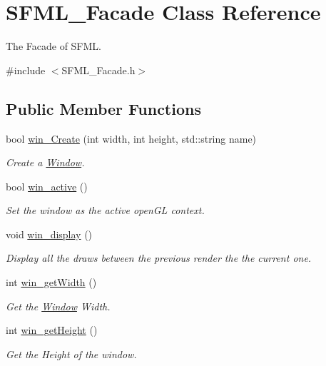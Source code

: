 \hypertarget{class_s_f_m_l___facade}{\section{S\-F\-M\-L\-\_\-\-Facade Class Reference}
\label{class_s_f_m_l___facade}
}


The Facade of S\-F\-M\-L.  




{\ttfamily \#include $<$S\-F\-M\-L\-\_\-\-Facade.\-h$>$}

\subsection*{Public Member Functions}
\begin{DoxyCompactItemize}
\item 
bool \hyperlink{class_s_f_m_l___facade_a6a7b88dd503f64f62fd92640981eccc9}{win\-\_\-\-Create} (int width, int height, std\-::string name)
\begin{DoxyCompactList}\small\item\em Create a \hyperlink{class_window}{Window}. \end{DoxyCompactList}\item 
bool \hyperlink{class_s_f_m_l___facade_ac698020c6dc577e2c3b7d9b226bd6f52}{win\-\_\-active} ()
\begin{DoxyCompactList}\small\item\em Set the window as the active open\-G\-L context. \end{DoxyCompactList}\item 
void \hyperlink{class_s_f_m_l___facade_adc4c6ebbd7fa6a1b59dd55cdf2d13b56}{win\-\_\-display} ()
\begin{DoxyCompactList}\small\item\em Display all the draws between the previous render the the current one. \end{DoxyCompactList}\item 
int \hyperlink{class_s_f_m_l___facade_a74825fe2634276a08d085c20873ad3ab}{win\-\_\-get\-Width} ()
\begin{DoxyCompactList}\small\item\em Get the \hyperlink{class_window}{Window} Width. \end{DoxyCompactList}\item 
int \hyperlink{class_s_f_m_l___facade_ac75771d37a899ee7a998320591f42b87}{win\-\_\-get\-Height} ()
\begin{DoxyCompactList}\small\item\em Get the Height of the window. \end{DoxyCompactList}\item 

\end{DoxyCompactItemize}

